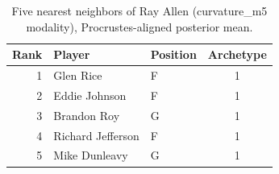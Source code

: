 \begin{table}[htbp]
  \centering\small
  \begin{tabular}{rllc}
    \toprule
    Rank & Player & Position & Archetype \\
    \midrule
    1 & Glen Rice & F & 1 \\
    2 & Eddie Johnson & F & 1 \\
    3 & Brandon Roy & G & 1 \\
    4 & Richard Jefferson & F & 1 \\
    5 & Mike Dunleavy & G & 1 \\
    \bottomrule
  \end{tabular}
  \caption{Five nearest neighbors of Ray Allen (curvature_m5 modality), Procrustes-aligned posterior mean.}
  \label{tab:Ray_Allen_neighbors_curvature_m5}
\end{table}

